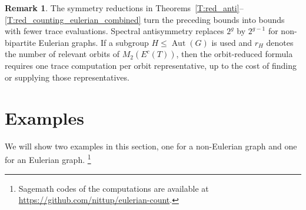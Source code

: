 \documentclass[11pt]{amsart}
\theoremstyle{plain}
\theoremstyle{definition}
\newtheorem{remark}[theorem]{Remark}
\DeclareMathOperator{\Aut}{\operatorname{Aut}}
\numberwithin{equation}{section}
\begin{document}
\begin{remark}
The symmetry reductions in Theorems~\ref{T:red_anti}--\ref{T:red_counting_eulerian_combined} turn the preceding bounds into bounds with fewer trace evaluations.  Spectral antisymmetry replaces $2^g$ by $2^{g-1}$ for non-bipartite Eulerian graphs.  If a subgroup $H\leq \Aut(G)$ is used and $r_H$ denotes the number of relevant orbits of $M_2(E^c(T))$, then the orbit-reduced formula requires one trace computation per orbit representative, up to the cost of finding or supplying those representatives.
\end{remark}

\section{Examples}
We will show two examples  in this section, one for a non-Eulerian graph and one for an Eulerian graph. \footnote{Sagemath codes of the computations are available at \url{https://github.com/nittup/eulerian-count}.}
\end{document}

